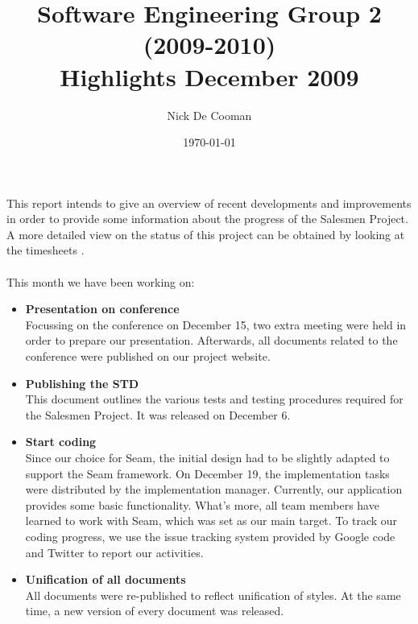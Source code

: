\documentclass{article}
\begin{document}
	\title{Software Engineering Group 2 (2009-2010) \\ Highlights December 2009}
	\author{Nick De Cooman}
	\date {\today}

\maketitle

This report intends to give an overview of recent developments and improvements in order to provide some information about the progress of the Salesmen Project. A more detailed view on the status of this project can be obtained by looking at the timesheets \cite{timesheets}. \\
\\
This month we have been working on:

\begin{itemize}
	
	
\item \textbf{Presentation on conference} \\
  Focussing on the conference on December 15, two extra meeting were held in order to prepare our presentation. Afterwards, all documents \cite{conference} related to the conference were published on our project website. 
  
\item \textbf{Publishing the STD} \\
  This document \cite{std} outlines the various tests and testing procedures required for the Salesmen Project. It was released on December 6.
  
\item \textbf{Start coding} \\
  Since our choice for Seam, the initial design had to be slightly adapted to 
  support the Seam framework. On December 19, the implementation tasks were 
  distributed \cite{tasks} by the implementation manager. Currently, 
  our application provides some basic functionality. What's more, all team 
  members have learned to work with Seam, which was set as our main target. 
  To track our coding progress, we use the issue tracking system \cite{issues}
  provided by Google code and Twitter \cite{twitter} to report our activities. 

\item \textbf{Unification of all documents} \\
  All documents were re-published to reflect unification of styles. At the same time, a new version of every document was released.
\end{itemize}
\end{document}
